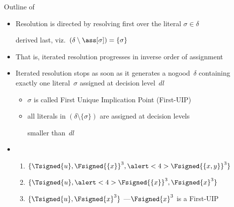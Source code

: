 \begin{frame}{Outline of \ConflictAnalysis}
  \begin{itemize}
    \item<2-> Resolution is directed by resolving first over the literal $\sigma\in\delta$
      \par
      derived last, viz.\ $(\delta\setminus\ass[\sigma])=\{\sigma\}$
    \item <2->[]
          That is, iterated resolution progresses in inverse order of assignment
          \smallskip
    \item<5-> Iterated resolution stops as soon as it generates
      a nogood~$\delta$ containing exactly one literal~$\sigma$ assigned
      at decision level~$\mathit{dl}$
      \begin{itemize}\normalsize
        \item $\sigma$ is called \alert{First Unique Implication Point} (First-UIP)
        \item all literals in $(\delta\setminus\{\sigma\})$ are assigned
              at decision levels\par smaller than~$\mathit{dl}$
      \end{itemize}
      \smallskip
    \item<3->  \
      \begin{enumerate}\normalsize
        \item $\{\Tsigned{u},\Fsigned{\{x\}}^3,\alert<4>{\Fsigned{\{x,y\}}}^3\}$
              \smallskip
        \item $\{\Tsigned{u},\alert<4>{\Fsigned{\{x\}}}^3,\Fsigned{x}^3\}$
              \smallskip
        \item $\{\Tsigned{u},\Fsigned{x}^3\}$ \quad\pause[6] ---\quad  $\Fsigned{x}^3$ is a First-UIP
      \end{enumerate}
  \end{itemize}
\end{frame}
\begin{frame}[c]
  
\end{frame}

